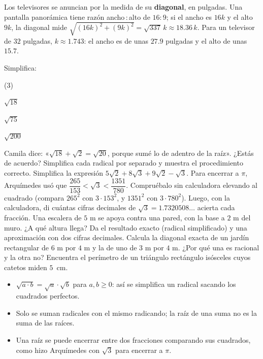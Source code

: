 \documentclass[11pt]{article}
\begin{document}
\begin{aplicacion}
Los televisores se anuncian por la medida de su \textbf{diagonal}, en
pulgadas. Una pantalla panorámica tiene razón ancho\,:\,alto de $16:9$; si el
ancho es $16k$ y el alto $9k$, la diagonal mide
$\sqrt{(16k)^2 + (9k)^2} = \sqrt{337}\,k \approx \num{18,36}\,k$. Para un
televisor de $32$ pulgadas, $k \approx \num{1,743}$: el ancho es de unas
$\num{27,9}$ pulgadas y el alto de unas $\num{15,7}$.
\end{aplicacion}

\begin{preguntas}
\pregunta Simplifica:
\begin{opciones*}(3)
  \item $\sqrt{18}$
  \item $\sqrt{75}$
  \item $\sqrt{200}$
\end{opciones*}
\espacio{3cm}
\pregunta Camila dice: «$\sqrt{18} + \sqrt{2} = \sqrt{20}$, porque sumé lo
de adentro de la raíz». ¿Estás de acuerdo? Simplifica cada radical por
separado y muestra el procedimiento correcto.
\espacio{3cm}
\pregunta Simplifica la expresión $5\sqrt{2} + 8\sqrt{3} + 9\sqrt{2} - \sqrt{3}$.
\espacio{2cm}
\pregunta Para encerrar a $\pi$, Arquímedes usó que $\dfrac{265}{153} <
\sqrt{3} < \dfrac{1351}{780}$. Compruébalo sin calculadora elevando al
cuadrado (compara $265^2$ con $3 \cdot 153^2$, y $1351^2$ con
$3 \cdot 780^2$). Luego, con la calculadora, di cuántas cifras decimales de
$\sqrt{3} = \num{1,7320508}\ldots$ acierta cada fracción.
\espacio{3.5cm}
\pregunta Una escalera de $5$ m se apoya contra una pared, con la base a
$2$ m del muro. ¿A qué altura llega? Da el resultado exacto (radical
simplificado) y una aproximación con dos cifras decimales.
\espacio{3cm}
\pregunta Calcula la diagonal exacta de un jardín rectangular de $6$ m por
$4$ m y la de uno de $3$ m por $4$ m. ¿Por qué una es racional y la otra no?
\espacio{3cm}
\pregunta Encuentra el perímetro de un triángulo rectángulo isósceles cuyos
catetos miden $5$~cm.
\espacio{2.5cm}
\end{preguntas}

\begin{resumen}
\begin{itemize}
  \item $\sqrt{a \cdot b} = \sqrt{a} \cdot \sqrt{b}$ para $a, b \ge 0$: así se
        simplifica un radical sacando los cuadrados perfectos.
  \item Solo se suman radicales con el mismo radicando; la raíz de una suma
        no es la suma de las raíces.
  \item Una raíz se puede encerrar entre dos fracciones comparando sus
        cuadrados, como hizo Arquímedes con $\sqrt{3}$ para encerrar a $\pi$.
\end{itemize}
\end{resumen}
\end{document}
